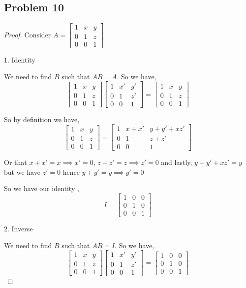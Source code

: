\documentclass[a4paper]{report}
\begin{document}
\subsection*{Problem 10}
\begin{proof}
    Consider $A = \begin{bmatrix} 1 & x & y  \\ 0 & 1 & z \\ 0 & 0 & 1\end{bmatrix}$

    1. Identity

    We need to find $B$ such that $AB = A$. So we have,  
    $$ \begin{bmatrix} 1 & x & y  \\ 0 & 1 & z \\ 0 & 0 & 1\end{bmatrix} \begin{bmatrix} 1 & x' & y'  \\ 0 & 1 & z' \\ 0 & 0 & 1\end{bmatrix} = \begin{bmatrix} 1 & x & y  \\ 0 & 1 & z \\ 0 & 0 & 1\end{bmatrix} $$           

    So by definition we have, 
    $$ \begin{bmatrix} 1 & x & y  \\ 0 & 1 & z \\ 0 & 0 & 1\end{bmatrix} = \begin{bmatrix} 1 & x + x' & y + y' + xz'  \\ 0 & 1 & z + z' \\ 0 & 0 & 1\end{bmatrix} $$ 

    Or that $x + x' = x \implies x' = 0$, $z + z' = z \implies z' = 0$ and lastly,   $y + y' + xz' = y$ but we have  $z' = 0$ hence $y + y' = y \implies y' = 0$

    So we have our identity ,  
    $$I =  \begin{bmatrix} 1 & 0 & 0  \\ 0 & 1 & 0 \\ 0 & 0 & 1\end{bmatrix}  $$ 



    2. Inverse

    We need to find $B$ such that $AB = I$. So we have, 
    $$  \begin{bmatrix} 1 & x & y  \\ 0 & 1 & z \\ 0 & 0 & 1\end{bmatrix}  \begin{bmatrix} 1 & x' & y'  \\ 0 & 1 & z' \\ 0 & 0 & 1\end{bmatrix}  =  \begin{bmatrix} 1 & 0 & 0  \\ 0 & 1 & 0 \\ 0 & 0 & 1\end{bmatrix}  $$ 


\end{proof}
\end{document}
